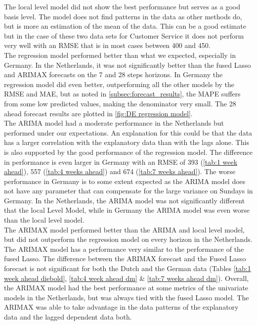 The local level model did not show the best performance but serves as a good basis level. The model does not find patterns in the data as other methods do, but is more an estimation of the mean of the data. This can be a good estimate but in the case of these two data sets for Customer Service it does not perform very well with an RMSE that is in most cases between 400 and 450.\\

The regression model performed better than what we expected, especially in Germany. In the Netherlands, it was not significantly better than the fused Lasso and ARIMAX forecasts on the 7 and 28 steps horizons. In Germany the regression model did even better, outperforming all the other models by the RMSE and MAE, but as noted in \autoref{subsec:forecast_results}, the MAPE suffers from some low predicted values, making the denominator very small. The 28 ahead forecast results are plotted in \autoref{fig:DE regression model}.\\

The ARIMA model had a moderate performance in the Netherlands but performed under our expectations. An explanation for this could be that the data has a larger correlation with the explanatory data than with the lags alone. This is also supported by the good performance of the regression model. The difference in performance is even larger in Germany with an RMSE of 393 (\autoref{tab:1 week ahead}), 557 (\autoref{tab:4 weeks ahead}) and 674 (\autoref{tab:7 weeks ahead}). The worse performance in Germany is to some extent expected as the ARIMA model does not have any parameter that can compensate for the large variance on Sundays in Germany. In the Netherlands, the ARIMA model was not significantly different that the local Level Model, while in Germany the ARIMA model was even worse than the local level model.\\

The ARIMAX model performed better than the ARIMA and local level model, but did not outperform the regression model on every horizon in the Netherlands. The ARIMAX model has a performance very similar to the performance of the fused Lasso. The difference between the ARIMAX forecast and the Fused Lasso forecast is not significant for both the Dutch and the German data (Tables \ref{tab:1 week ahead diebold}, \ref{tab:4 week ahead dm} \& \ref{tab:7 weeks ahead dm}). Overall, the ARIMAX model had the best performance at some metrics of the univariate models in the Netherlands, but was always tied with the fused Lasso model. The ARIMAX was able to take advantage in the data patterns of the explanatory data and the lagged dependent data both.\\

